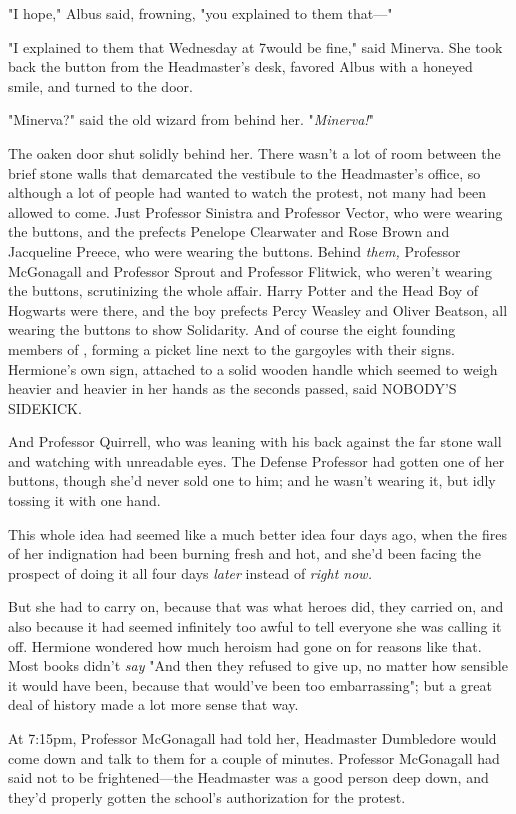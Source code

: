 "I hope," Albus said, frowning, "you explained to them that---"

"I explained to them that Wednesday at 7\PM would be fine," said Minerva. She 
took back the button from the Headmaster's desk, favored Albus with a honeyed 
smile, and turned to the door.

"Minerva?" said the old wizard from behind her. "\emph{Minerva!}"

The oaken door shut solidly behind her.
\sbreak
There wasn't a lot of room between the brief stone walls that demarcated the 
vestibule to the Headmaster's office, so although a lot of people had wanted to 
watch the protest, not many had been allowed to come. Just Professor Sinistra 
and Professor Vector, who were wearing the buttons, and the prefects Penelope 
Clearwater and Rose Brown and Jacqueline Preece, who were wearing the buttons. 
Behind \emph{them,} Professor McGonagall and Professor Sprout and Professor 
Flitwick, who weren't wearing the buttons, scrutinizing the whole affair. Harry 
Potter and the Head Boy of Hogwarts were there, and the boy prefects Percy 
Weasley and Oliver Beatson, all wearing the buttons to show Solidarity. And of 
course the eight founding members of \SPHEW, forming a picket line next to 
the gargoyles with their signs. Hermione's own sign, attached to a solid wooden 
handle which seemed to weigh heavier and heavier in her hands as the seconds 
passed, said NOBODY'S SIDEKICK.

And Professor Quirrell, who was leaning with his back against the far stone 
wall and watching with unreadable eyes. The Defense Professor had gotten one of 
her buttons, though she'd never sold one to him; and he wasn't wearing it, but 
idly tossing it with one hand.

This whole idea had seemed like a much better idea four days ago, when the 
fires of her indignation had been burning fresh and hot, and she'd been facing 
the prospect of doing it all four days \emph{later} instead of \emph{right now.}

But she had to carry on, because that was what heroes did, they carried on, and 
also because it had seemed infinitely too awful to tell everyone she was 
calling it off. Hermione wondered how much heroism had gone on for reasons like 
that. Most books didn't \emph{say} "And then they refused to give up, no matter 
how sensible it would have been, because that would've been too embarrassing"; 
but a great deal of history made a lot more sense that way.

At 7:15pm, Professor McGonagall had told her, Headmaster Dumbledore would come 
down and talk to them for a couple of minutes. Professor McGonagall had said 
not to be frightened---the Headmaster was a good person deep down, and they'd 
properly gotten the school's authorization for the protest.

